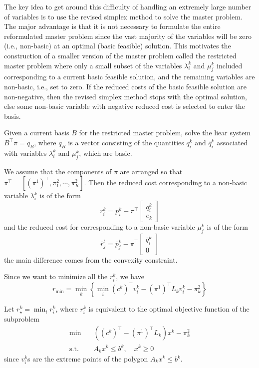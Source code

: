 The key idea to get around this difficulty of handling an extremely large number of variables is to use the revised simplex method to solve the master problem. The major advantage is that it is not necessary to formulate the
entire reformulated master problem since the vast majority of the variables
will be zero (i.e., non-basic) at an optimal (basic feasible) solution. This motivates the construction of a smaller version of the master problem
called the restricted master problem where only a small subset of the variables $\lambda_i^k$ and $\mu_j^k$ included corresponding to a current basic feasible solution, and the remaining variables are non-basic, i.e., set to zero. If the reduced costs of the basic feasible solution are non-negative, then the revised simplex method stops with the optimal solution, else some non-basic variable with negative reduced cost is selected to enter the basis.

Given a current basis $B$ for the restricted master problem, solve the liear system $B^\top \pi = q_B$, where $q_B$ is a vector consisting of the quantities $q_i^k$ and $\bar{q}_i^k$ associated with variables $\lambda_i^k$ and $\mu_j^k$, which are basic. 

We assume that the components of $\pi$ are arranged so that $\pi^\top = [(\pi^1)^\top, \pi^2_1,\cdots,\pi_K^2]$. Then the reduced cost corresponding to a non-basic variable $\lambda_i^k$ is of the form
\begin{equation}
    r_i^k = p_i^k- \pi^\top \left[\begin{matrix}
    q_i^k\\e_k
    \end{matrix}\right]
\end{equation}
and the reduced cost for corresponding to a non-basic variable $\mu^k_j$ is of the form
\begin{equation}
    \bar{r}_j^l=\bar{p}_j^k-\pi^\top \left[\begin{matrix}
    \bar{q}_i^k\\0
    \end{matrix}\right]
\end{equation}
the main difference comes from the convexity constraint. 

Since we want to minimize all the $r_i^k$,  we have
\begin{equation}
    r_{\min}=\min_k \left\{
    \min_i (c^k)^\top v_i^k - (\pi^1)^\top L_k v_i^k -\pi_k^2
    \right\}
\end{equation}

Let $r_\star^k=\min_i {r_i^k}$, where $r_i^k$ is equivalent to the optimal objective function of the subproblem
\begin{equation}
\label{eq:dantzig_subproblem}
\begin{split}
        \min&\quad ((c^k)^\top -(\pi^1)^\top L_k)x^k-\pi^2_k\\
        \text{s.t.}&\quad A_k x^k \leq b^k,\quad x^k\geq 0
\end{split}
\end{equation}
since $v_i^k$s are the extreme points of the polygon $A_kx^k\leq b^k$.  

